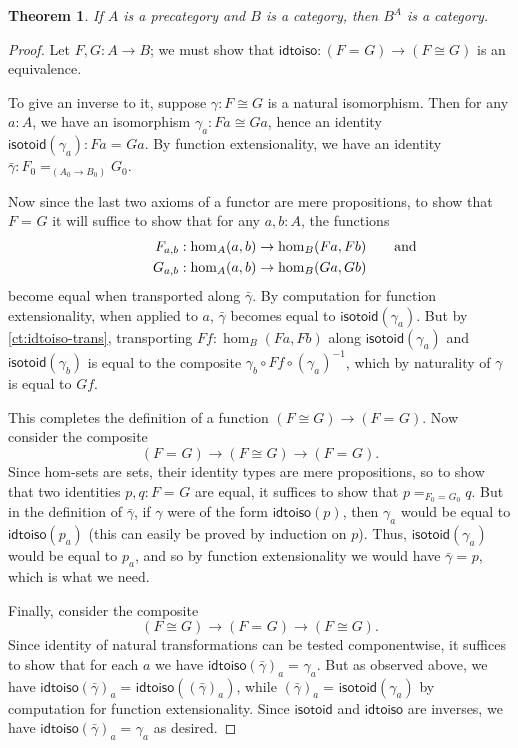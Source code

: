 \documentclass[10pt,a4paper]{article}
\providecommand{\index}[1]{}
\newcommand{\id}[3][]{\ensuremath{#2 =_{#1} #3}\xspace}
\newcommand{\inv}[1]{{#1}^{-1}}
\newcommand{\idtoiso}{\ensuremath{\mathsf{idtoiso}}\xspace}
\newcommand{\isotoid}{\ensuremath{\mathsf{isotoid}}\xspace}
\newtheorem{thm}{Theorem}[section]
\theoremstyle{definition}
\theoremstyle{remark}
\numberwithin{equation}{section}
\newcommand{\indexdef}[1]{\index{#1|defstyle}}   %
\begin{document}
\begin{thm}\label{ct:functor-cat}
  \indexdef{category!of functors}%
  \indexdef{functor!category of}%
  If $A$ is a precategory and $B$ is a category, then $B^A$ is a category.
\end{thm}

\begin{proof}
  Let $F,G:A\to B$; we must show that $\idtoiso:(\id{F}{G}) \to (F\cong G)$ is an equivalence.

  To give an inverse to it, suppose $\gamma:F\cong G$ is a natural isomorphism.
  Then for any $a:A$, we have an isomorphism $\gamma_a:Fa \cong Ga$, hence an identity $\isotoid(\gamma_a):\id{Fa}{Ga}$.
  By function extensionality, we have an identity $\bar{\gamma}:\id[(A_0\to B_0)]{F_0}{G_0}$.

  Now since the last two axioms of a functor are mere propositions, to show that $\id{F}{G}$ it will suffice to show that for any $a,b:A$, the functions
  \begin{align*}
    F_{a,b}&:\hom_A(a,b) \to \hom_B(Fa,Fb)\mathrlap{\qquad\text{and}}\\
    G_{a,b}&:\hom_A(a,b) \to \hom_B(Ga,Gb)
  \end{align*}
  become equal when transported along $\bar\gamma$.
  By computation for function extensionality, when applied to $a$, $\bar\gamma$ becomes equal to $\isotoid(\gamma_a)$.
  But by \cref{ct:idtoiso-trans}, transporting $Ff:\hom_B(Fa,Fb)$ along $\isotoid(\gamma_a)$ and $\isotoid(\gamma_b)$ is equal to the composite $\gamma_b\circ Ff\circ \inv{(\gamma_a)}$, which by naturality of $\gamma$ is equal to $Gf$.

  This completes the definition of a function $(F\cong G) \to (\id F G)$.
  Now consider the composite
  \[ (\id F G) \to (F\cong G) \to (\id F G). \]
  Since hom-sets are sets, their identity types are mere propositions, so to show that two identities $p,q:\id F G$ are equal, it suffices to show that $\id[\id{F_0}{G_0}]{p}{q}$.
  But in the definition of $\bar\gamma$, if $\gamma$ were of the form $\idtoiso(p)$, then $\gamma_a$ would be equal to $\idtoiso(p_a)$ (this can easily be proved by induction on $p$).
  Thus, $\isotoid(\gamma_a)$ would be equal to $p_a$, and so by function extensionality we would have $\id{\bar\gamma}{p}$, which is what we need.

  Finally, consider the composite
  \[(F\cong G)\to  (\id F G) \to (F\cong G). \]
  Since identity of natural transformations can be tested componentwise, it suffices to show that for each $a$ we have $\id{\idtoiso(\bar\gamma)_a}{\gamma_a}$.
  But as observed above, we have $\id{\idtoiso(\bar\gamma)_a}{\idtoiso((\bar\gamma)_a)}$, while $\id{(\bar\gamma)_a}{\isotoid(\gamma_a)}$ by computation for function extensionality.
  Since $\isotoid$ and $\idtoiso$ are inverses, we have $\id{\idtoiso(\bar\gamma)_a}{\gamma_a}$ as desired.
\end{proof}
\end{document}
